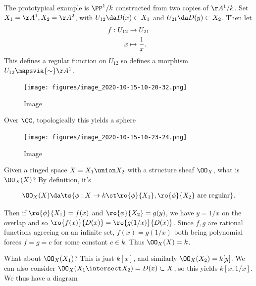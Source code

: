\begin{example}

The prototypical example is \(\PP^1/k\) constructed from two copies of
\(\AA^1/k\). Set \(X_1 = \AA^1, X_2 = \AA^2\), with
\(U_{12} \da D(x) \subset X_1\) and \(U_{21} \da D(y) \subset X_2\).
Then let
\begin{align*}  
f: U_{12} &\to U_{21} \\
x & \mapsto {1\over x}
.\end{align*} This defines a regular function on \(U_{12}\) so defines a
morphism \(U_{12} \mapsvia{\sim} \AA^1\).

\begin{figure}
\centering
\texttt{[image: figures/image\_2020-10-15-10-20-32.png]}
\caption{Image}
\end{figure}

Over \(\CC\), topologically this yields a sphere

\begin{figure}
\centering
\texttt{[image: figures/image\_2020-10-15-10-23-24.png]}
\caption{Image}
\end{figure}

Given a ringed space \(X = X_1\union X_2\) with a structure sheaf
\(\OO_X\), what is \(\OO_X(X)\)? By definition, it's

\begin{align*}  
\OO_X(X) \da \ts{\phi: X\to k \st \ro{\phi}{X_1}, \ro{\phi}{X_2} \text{ are regular} }
.\end{align*}

Then if \(\ro{\phi}{X_1} = f(x)\) and \(\ro{\phi}{X_2} = g(y)\), we have
\(y=1/x\) on the overlap and so \(\ro{f(x)}{D(x)} = \ro{g(1/x)}{D(x)}\).
Since \(f, g\) are rational functions agreeing on an infinite set,
\(f(x) = g(1/x)\) both being polynomial forces \(f = g = c\) for some
constant \(c \in k\). Thus \(\OO_X(X) = k\).

What about \(\OO_X(X_1)\)? This is just \(k[x]\), and similarly
\(\OO_X(X_2) = k[y]\). We can also consider
\(\OO_X(X_1\intersect X_2) = D(x) \subset X\), so this yields
\(k[x, 1/x]\). We thus have a diagram

\begin{center}\end{center}

\end{example}

